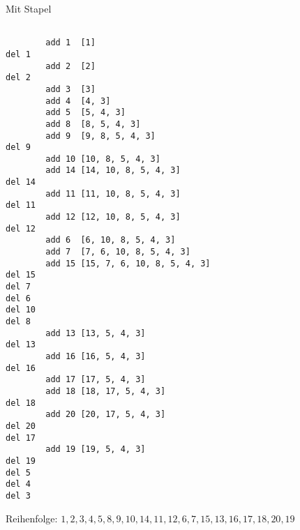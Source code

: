 \documentclass{bschlangaul-aufgabe}
\begin{document}
\begin{enumerate}
\begin{bAntwort}
Mit Stapel
{\footnotesize
\begin{verbatim}

        add 1  [1]
del 1
        add 2  [2]
del 2
        add 3  [3]
        add 4  [4, 3]
        add 5  [5, 4, 3]
        add 8  [8, 5, 4, 3]
        add 9  [9, 8, 5, 4, 3]
del 9
        add 10 [10, 8, 5, 4, 3]
        add 14 [14, 10, 8, 5, 4, 3]
del 14
        add 11 [11, 10, 8, 5, 4, 3]
del 11
        add 12 [12, 10, 8, 5, 4, 3]
del 12
        add 6  [6, 10, 8, 5, 4, 3]
        add 7  [7, 6, 10, 8, 5, 4, 3]
        add 15 [15, 7, 6, 10, 8, 5, 4, 3]
del 15
del 7
del 6
del 10
del 8
        add 13 [13, 5, 4, 3]
del 13
        add 16 [16, 5, 4, 3]
del 16
        add 17 [17, 5, 4, 3]
        add 18 [18, 17, 5, 4, 3]
del 18
        add 20 [20, 17, 5, 4, 3]
del 20
del 17
        add 19 [19, 5, 4, 3]
del 19
del 5
del 4
del 3
\end{verbatim}
}

Reihenfolge: $1, 2, 3, 4, 5, 8, 9, 10, 14, 11, 12, 6, 7, 15, 13, 16, 17, 18, 20, 19$
\end{bAntwort}

\end{enumerate}
\end{document}
